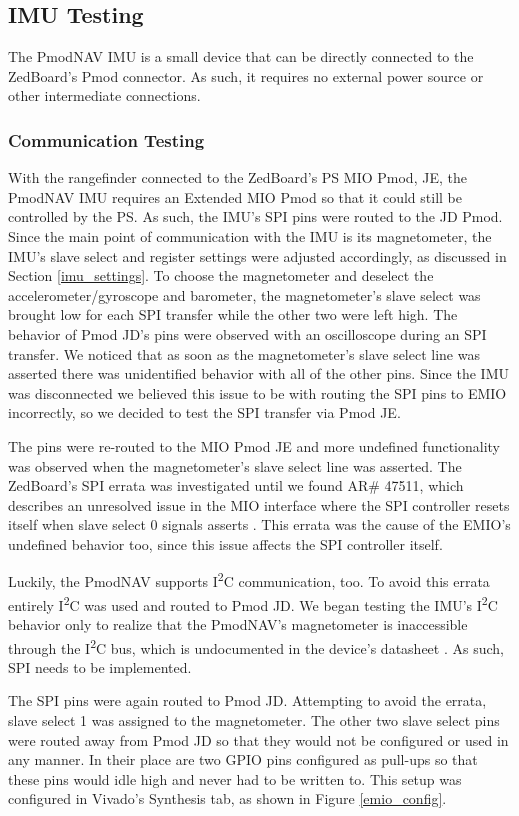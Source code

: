 \subsection{IMU Testing}
The PmodNAV IMU is a small device that can be directly connected to the ZedBoard's Pmod connector. As such, it requires no external power source or other intermediate connections.

\subsubsection{Communication Testing}
With the rangefinder connected to the ZedBoard's PS MIO Pmod, JE, the PmodNAV IMU requires an Extended MIO Pmod so that it could still be controlled by the PS. As such, the IMU's SPI pins were routed to the JD Pmod. Since the main point of communication with the IMU is its magnetometer, the IMU's slave select and register settings were adjusted accordingly, as discussed in Section \ref{imu_settings}. To choose the magnetometer and deselect the accelerometer/gyroscope and barometer, the magnetometer's slave select was brought low for each SPI transfer while the other two were left high. The behavior of Pmod JD's pins were observed with an oscilloscope during an SPI transfer. We noticed that as soon as the magnetometer's slave select line was asserted there was unidentified behavior with all of the other pins. Since the IMU was disconnected we believed this issue to be with routing the SPI pins to EMIO incorrectly, so we decided to test the SPI transfer via Pmod JE.
\par
The pins were re-routed to the MIO Pmod JE and more undefined functionality was observed when the magnetometer's slave select line was asserted. The ZedBoard's SPI errata was investigated until we found AR\# 47511, which describes an unresolved issue in the MIO interface where the SPI controller resets itself when slave select 0 signals asserts \cite{zedboardErrata}. This errata was the cause of the EMIO's undefined behavior too, since this issue affects the SPI controller itself.
\par
Luckily, the PmodNAV supports I\textsuperscript{2}C communication, too. To avoid this errata entirely I\textsuperscript{2}C was used and routed to Pmod JD. We began testing the IMU's I\textsuperscript{2}C behavior only to realize that the PmodNAV's magnetometer is inaccessible through the I\textsuperscript{2}C bus, which is undocumented in the device's datasheet \cite{lsm9ds1}. As such, SPI needs to be implemented.
\par
The SPI pins were again routed to Pmod JD. Attempting to avoid the errata, slave select 1 was assigned to the magnetometer. The other two slave select pins were routed away from Pmod JD so that they would not be configured or used in any manner. In their place are two GPIO pins configured as pull-ups so that these pins would idle high and never had to be written to. This setup was configured in Vivado's Synthesis tab, as shown in Figure \ref{emio_config}. 

